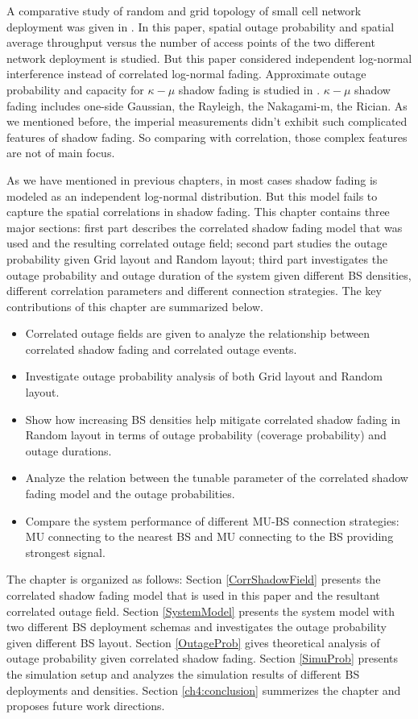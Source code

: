 \par A comparative study of random and grid topology of small cell network deployment was given in \cite{chen2012small}. In this paper, spatial outage probability and spatial average throughput versus the number of access points of the two different network deployment is studied. But this paper considered independent log-normal interference instead of correlated log-normal fading. Approximate outage probability and capacity for $\kappa-\mu$ shadow fading is studied in \cite{kumar2015approximate}. $\kappa-\mu$ shadow fading includes one-side Gaussian, the Rayleigh, the Nakagami-m, the Rician. As we mentioned before, the imperial measurements didn't exhibit such complicated features of shadow fading. So comparing with correlation, those complex features are not of main focus.
\par As we have mentioned in previous chapters, in most cases shadow fading is modeled as an independent log-normal distribution. But this model fails to capture the spatial correlations in shadow fading. This chapter contains three major sections: first part describes the correlated shadow fading model that was used and the resulting correlated outage field; second part studies the outage probability given Grid layout and Random layout; third part investigates the outage probability and outage duration of the system given different BS densities, different correlation parameters and different connection strategies. The key contributions of this chapter are summarized below.
\begin{itemize}
\item Correlated outage fields are given to analyze the relationship between correlated shadow fading and correlated outage events. 
\item Investigate outage probability analysis of both Grid layout and Random layout.
\item Show how increasing BS densities help mitigate correlated shadow fading in Random layout in terms of outage probability (coverage probability) and outage durations.
\item Analyze the relation between the tunable parameter of the correlated shadow fading model and the outage probabilities.
\item Compare the system performance of different MU-BS connection strategies: MU connecting to the nearest BS and MU connecting to the BS providing strongest signal.
\end{itemize}
The chapter is organized as follows: Section \ref{CorrShadowField} presents the correlated shadow fading model that is used in this paper and the resultant correlated outage field. Section \ref{SystemModel} presents the system model with two different BS deployment schemas and investigates the outage probability given different BS layout. Section \ref{OutageProb} gives theoretical analysis of outage probability given correlated shadow fading. Section \ref{SimuProb} presents the simulation setup and analyzes the simulation results of different BS deployments and densities. Section \ref{ch4:conclusion} summerizes the chapter and proposes future work directions.
